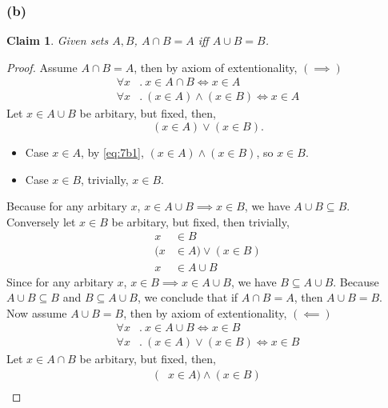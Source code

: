 \documentclass[12pt]{article}
\newtheorem*{claim}{Claim}
\begin{document}
\subsubsection*{(b)}
\begin{claim}
    Given sets $A, B$, $A \cap B = A$ iff $A \cup B = B$.
\end{claim}
\begin{proof}
    Assume $A \cap B = A$, then by axiom of extentionality,
        \hfill$(\implies)$
        \begin{align}
            \forall x&.~ x \in A \cap B \iff x \in A \nonumber \\
            \forall x&.~ (x \in A) \land (x \in B) \iff x \in A \label{eq:7b1}
        \end{align}
    Let $x \in A \cup B$ be arbitary, but fixed, then,
        $$(x \in A) \lor (x \in B).$$
        \begin{itemize}[label={}]
            \item Case $x \in A$, by \eqref{eq:7b1}, $(x \in A) \land (x \in B)$, so $x \in B$.
            \item Case $x \in B$, trivially, $x \in B$.
        \end{itemize}
    Because for any arbitary $x$,
        $x \in A \cup B \implies x \in B$, we have $A \cup B \subseteq B$.\\
    Conversely let $x \in B$ be arbitary, but fixed, then trivially,
    \begin{align*}
        x &\in B\\
        (x &\in A) \lor (x \in B)\\
        x &\in A \cup B
    \end{align*}
    Since for any arbitary $x$,
        $x \in B \implies x \in A \cup B$, we have $B \subseteq A \cup B$.
    Because $A \cup B \subseteq B$ and $B \subseteq A \cup B$, we conclude that
        if $A \cap B = A$, then $A \cup B = B$.\\
    Now assume $A \cup B = B$, then by axiom of extentionality,
        \hfill$(\impliedby)$
        \begin{align}
            \forall x&.~ x \in A \cup B \iff x \in B \nonumber \\
            \forall x&.~ (x \in A) \lor (x \in B) \iff x \in B \label{eq:7b2}
        \end{align}
    Let $x \in A \cap B$ be arbitary, but fixed, then,
        \begin{align*}
            (&x \in A) \land (x \in B)\\

\end{align*}
\end{proof}
\end{document}
